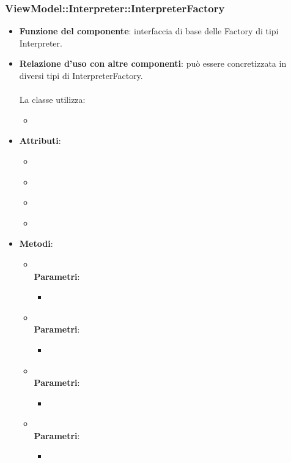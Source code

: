 \subsubsection{ViewModel::Interpreter::InterpreterFactory}
\begin{itemize}
\item\textbf{Funzione del componente}: interfaccia di base delle Factory di tipi Interpreter.
	\item\textbf{Relazione d'uso con altre componenti}: può essere concretizzata in diversi tipi di InterpreterFactory.\\ \\
La classe utilizza:
	\begin{itemize}
		\item
	\end{itemize}
\item\textbf{Attributi}:
	\begin{itemize}
		\item\code{}\\
		\item\code{}\\
		\item\code{}\\
		\item\code{}\\
	\end{itemize}
\item\textbf{Metodi}:
	\begin{itemize}
		\item\code{}\\
		\textbf{Parametri}:
			\begin{itemize}
				\item\code{}\\
			\end{itemize}
		\item\code{}\\
		\textbf{Parametri}:
			\begin{itemize}
				\item\code{}\\
			\end{itemize}
		\item\code{}\\
		\textbf{Parametri}:
			\begin{itemize}
				\item\code{}\\
			\end{itemize}
		\item\code{}\\
		\textbf{Parametri}:
			\begin{itemize}
				\item\code{}\\
			\end{itemize}
	\end{itemize}
\end{itemize}

